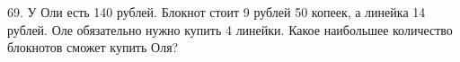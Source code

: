 69. У Оли есть 140 рублей. Блокнот стоит 9 рублей 50 копеек, а линейка 14 рублей. Оле обязательно нужно купить 4 линейки. Какое наибольшее количество блокнотов сможет купить Оля?\\
